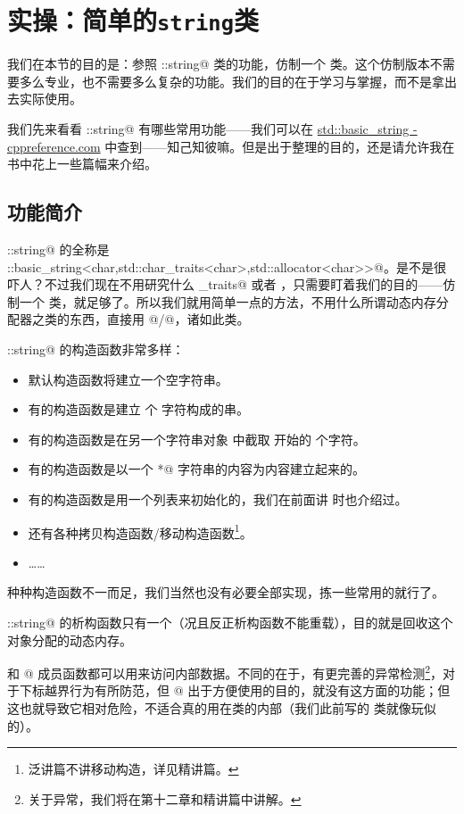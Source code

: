 \section{实操：简单的\texttt{string}类}
我们在本节的目的是：参照 \lstinline@std::string@ 类的功能，仿制一个 \lstinline@string@ 类。这个仿制版本不需要多么专业，也不需要多么复杂的功能。我们的目的在于学习与掌握，而不是拿出去实际使用。\par
我们先来看看 \lstinline@std::string@ 有哪些常用功能——我们可以在 \href{https://en.cppreference.com/w/cpp/string/basic\_string}{std::basic\_string - cppreference.com} 中查到——知己知彼嘛。但是出于整理的目的，还是请允许我在书中花上一些篇幅来介绍。\par
\subsection*{功能简介}
\lstinline@std::string@ 的全称是 \lstinline@std::basic_string<char,std::char_traits<char>,std::allocator<char>>@。是不是很吓人？不过我们现在不用研究什么 \lstinline@char_traits@ 或者 \lstinline@allocator@，只需要盯着我们的目的——仿制一个 \lstinline@string@ 类，就足够了。所以我们就用简单一点的方法，不用什么所谓动态内存分配器之类的东西，直接用 \lstinline@new[]@/\lstinline@delete[]@，诸如此类。\par
\lstinline@std::string@ 的构造函数非常多样：
\begin{itemize}
    \item 默认构造函数将建立一个空字符串。
    \item 有的构造函数是建立 \lstinline@count@ 个 \lstinline@ch@ 字符构成的串。
    \item 有的构造函数是在另一个字符串对象 \lstinline@other@ 中截取 \lstinline@pos@ 开始的 \lstinline@count@ 个字符。
    \item 有的构造函数是以一个 \lstinline@char*@ 字符串的内容为内容建立起来的。
    \item 有的构造函数是用一个列表来初始化的，我们在前面讲 \lstinline@valarri@ 时也介绍过。
    \item 还有各种拷贝构造函数/移动构造函数\footnote{泛讲篇不讲移动构造，详见精讲篇。}。
    \item ……
\end{itemize}
种种构造函数不一而足，我们当然也没有必要全部实现，拣一些常用的就行了。\par
\lstinline@std::string@ 的析构函数只有一个（况且反正析构函数不能重载），目的就是回收这个对象分配的动态内存。\par
\lstinline@at@ 和 \lstinline@operator[]@ 成员函数都可以用来访问内部数据。不同的在于，\lstinline@at@ 有更完善的异常检测\footnote{关于异常，我们将在第十二章和精讲篇中讲解。}，对于下标越界行为有所防范，但 \lstinline@operator[]@ 出于方便使用的目的，就没有这方面的功能；但这也就导致它相对危险，不适合真的用在类的内部（我们此前写的 \lstinline@valarri@ 类就像玩似的）。\par
